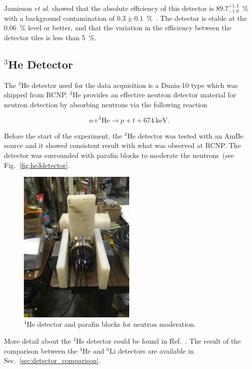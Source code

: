Jamieson {\it{et al.}} showed that the absolute efficiency of this
detector is $89.7^{+1.3}_{-1.9}$~\% with a background contamination of
$0.3 \pm 0.1$~\%~\cite{jamieson2017characterization}. The detector is
stable at the 0.06~\% level or better, and that the variation in the
efficiency between the detector tiles is less than 5~\%.
\subsection{$^3$He Detector}

The $^3$He detector used for the data acquisition is a Dunia-10 type
which was shipped from RCNP.  $^3$He provides an effective neutron
detector material for neutron detection by absorbing neutrons via the
following reaction

\begin{equation}
  \label{eqn:he3}
n + ^3\mathrm{He} \rightarrow p + t + 674~\mathrm{keV}.
\end{equation}

Before the start of the experiment, the $^3$He detector was tested
with an AmBe source and it showed consistent result with what was
observed at RCNP. The detector was surrounded with parafin blocks to
moderate the neutrons~(see Fig.~\ref{fig:he3detector}.

\begin{figure}[h]
  \centering
  \includegraphics[width=0.5\textwidth, angle = 270]{he3detector.png}
  \caption{$^3$He detector and parafin blocks for neutron
    moderation.}
  \label{fig:Li6detector}
\end{figure}

More detail about the $^3$He detector could be found in
Ref.~\cite{matsumiya_thesis}. The result of the comparison between the
$^3$He and $^6$Li detectors are available in
Sec.~\ref{sec:detector_comparison}.

